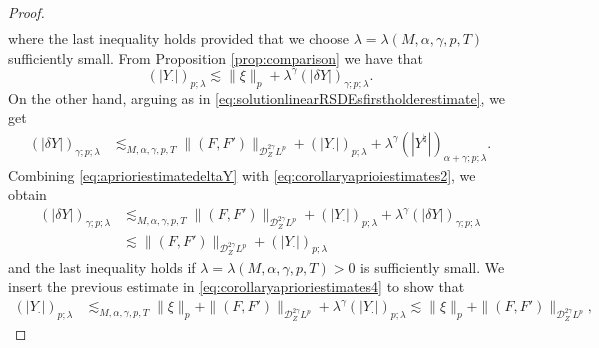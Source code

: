 \documentclass[11pt,a4paper]{article}
\theoremstyle{plain}
\begin{document}
\begin{proof}
\begin{equation}
\begin{aligned}
        \end{aligned}
    \end{equation}
    where the last inequality holds provided that we choose $\lambda=\lambda(M,\alpha,\gamma,p,T)$ sufficiently small.
    From Proposition \ref{prop:comparison} we have that \begin{equation} \label{eq:corollaryaprioriestimates4}
            (|Y_\cdot|)_{p;\lambda} \lesssim \|\xi\|_p + \lambda^\gamma (|\delta Y|)_{\gamma;p;\lambda}.
        \end{equation}  
    On the other hand, arguing as in \eqref{eq:solutionlinearRSDEsfirstholderestimate}, we get \begin{equation} \label{eq:aprioriestimatedeltaY}
        \begin{aligned}
            (|\delta Y|)_{\gamma;p;\lambda} 
            &\lesssim_{M,\alpha,\gamma,p,T} \|(F,F')\|_{\mathscr{D}^{2\gamma}_ZL^p}  +  (|Y_{\cdot}|)_{p;\lambda}  + \lambda^\gamma (|Y^\natural|)_{\alpha+\gamma;p;\lambda}.
        \end{aligned}
    \end{equation}
    Combining \eqref{eq:aprioriestimatedeltaY} with \eqref{eq:corollaryaprioiestimates2}, we obtain \begin{equation} \label{eq:corollaryaprioriestimates1}
        \begin{aligned}
            (|\delta Y|)_{\gamma;p;\lambda}
            &\lesssim_{M,\alpha,\gamma,p,T} \|(F,F')\|_{\mathscr{D}^{2\gamma}_ZL^{p}} + (|Y_{\cdot}|)_{p;\lambda} + \lambda^\gamma(|\delta Y|)_{\gamma;p;\lambda} \\
            &\lesssim \|(F,F')\|_{\mathscr{D}^{2\gamma}_ZL^{p}} + (|Y_{\cdot}|)_{p;\lambda} 
        \end{aligned}
    \end{equation} and the last inequality holds if $\lambda=\lambda(M,\alpha,\gamma,p,T)>0$ is sufficiently small.
    We insert the previous estimate in \eqref{eq:corollaryaprioriestimates4} to show that \begin{equation} \label{eq:corollaryaprioriestimates3}
       \begin{aligned}
           (|Y_{\cdot}|)_{p;\lambda} 
           &\lesssim_{M,\alpha,\gamma,p,T} \|\xi\|_p+ \|(F,F')\|_{\mathscr{D}^{2\gamma}_ZL^{p}} + \lambda^\gamma (|Y_{\cdot}|)_{p;\lambda} \lesssim  \|\xi\|_p + \|(F,F')\|_{\mathscr{D}^{2\gamma}_ZL^{p}},  

\end{aligned}
\end{equation}
\end{proof}
\end{document}
